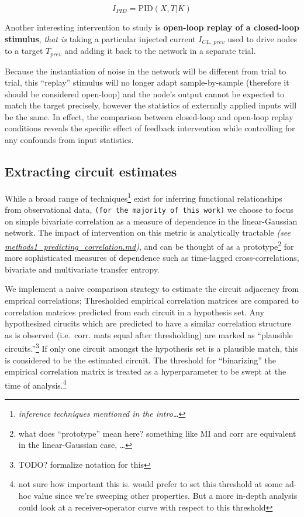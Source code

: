 \[I_{PID} = \text{PID}(X,T| K)\]

Another interesting intervention to study is \textbf{open-loop replay of
a closed-loop stimulus}, \emph{that is} taking a particular injected
current \(I_{CL,\,prev}\) used to drive nodes to a target \(T_{prev}\)
and adding it back to the network in a separate trial.

Because the instantiation of noise in the network will be different from
trial to trial, this ``replay'' stimulus will no longer adapt
sample-by-sample (therefore it should be considered open-loop) and the
node's output cannot be expected to match the target precisely, however
the statistics of externally applied inputs will be the same. In effect,
the comparison between closed-loop and open-loop replay conditions
reveals the specific effect of feedback intervention while controlling
for any confounds from input statistics.

\hypertarget{extracting-circuit-estimates}{%
\subsection{Extracting circuit
estimates}\label{extracting-circuit-estimates}}

While a broad range of techniques\footnote{\emph{inference techniques
  mentioned in the intro\ldots{}}} exist for inferring functional
relationships from observational data,
\texttt{(for\ the\ majority\ of\ this\ work)} we choose to focus on
simple bivariate correlation as a measure of dependence in the
linear-Gaussian network. The impact of intervention on this metric is
analytically tractable \emph{(see
\url{methods1_predicting_correlation.md})}, and can be thought of as a
prototype\footnote{what does ``prototype'' mean here? something like MI
  and corr are equivalent in the linear-Gaussian case, \ldots{}} for
more sophisticated measures of dependence such as time-lagged
cross-correlations, bivariate and multivariate transfer entropy.

We implement a naive comparison strategy to estimate the circuit
adjacency from emprical correlations; Thresholded empirical correlation
matrices are compared to correlation matrices predicted from each
circuit in a hypothesis set. Any hypothesized cirucits which are
predicted to have a similar correlation structure as is observed
(i.e.~corr. mats equal after thresholding) are marked as ``plausible
circuits.''\footnote{TODO? formalize notation for this} If only one
circuit amongst the hypothesis set is a plausible match, this is
considered to be the estimated circuit. The threshold for ``binarizing''
the empirical correlation matrix is treated as a hyperparameter to be
swept at the time of analysis.\footnote{not sure how important this is.
  would prefer to set this threshold at some ad-hoc value since we're
  sweeping other properties. But a more in-depth analysis could look at
  a receiver-operator curve with respect to this threshold}

